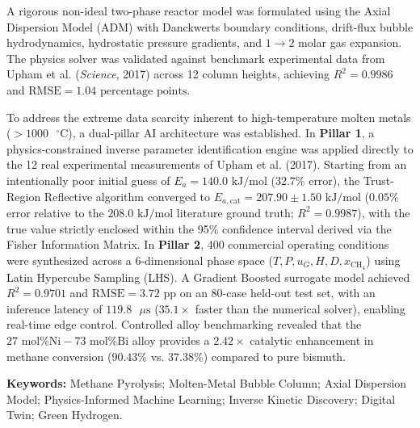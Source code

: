 \documentclass[12pt,a4paper,oneside]{report}
\begin{document}
A rigorous non-ideal two-phase reactor model was formulated using the Axial Dispersion Model (ADM) with Danckwerts boundary conditions, drift-flux bubble hydrodynamics, hydrostatic pressure gradients, and $1 \rightarrow 2$ molar gas expansion. The physics solver was validated against benchmark experimental data from Upham et al. (\textit{Science}, 2017) across 12 column heights, achieving $R^2 = 0.9986$ and $\text{RMSE} = 1.04\text{ percentage points}$.

To address the extreme data scarcity inherent to high-temperature molten metals ($>1000\text{ }^\circ\text{C}$), a dual-pillar AI architecture was established. In \textbf{Pillar 1}, a physics-constrained inverse parameter identification engine was applied directly to the 12 real experimental measurements of Upham et al. (2017). Starting from an intentionally poor initial guess of $E_a = 140.0\text{ kJ/mol}$ ($32.7\%$ error), the Trust-Region Reflective algorithm converged to $E_{a,\text{cat}} = 207.90 \pm 1.50\text{ kJ/mol}$ ($0.05\%$ error relative to the $208.0\text{ kJ/mol}$ literature ground truth; $R^2 = 0.9987$), with the true value strictly enclosed within the 95\% confidence interval derived via the Fisher Information Matrix. In \textbf{Pillar 2}, 400 commercial operating conditions were synthesized across a 6-dimensional phase space ($T, P, u_G, H, D, x_{\text{CH}_4}$) using Latin Hypercube Sampling (LHS). A Gradient Boosted surrogate model achieved $R^2 = 0.9701$ and $\text{RMSE} = 3.72\text{ pp}$ on an 80-case held-out test set, with an inference latency of $119.8\text{ }\mu\text{s}$ ($35.1\times$ faster than the numerical solver), enabling real-time edge control. Controlled alloy benchmarking revealed that the $27\text{ mol\% Ni}-73\text{ mol\% Bi}$ alloy provides a $2.42\times$ catalytic enhancement in methane conversion ($90.43\%$ vs. $37.38\%$) compared to pure bismuth.

\vspace{5mm}
\noindent \textbf{Keywords:} Methane Pyrolysis; Molten-Metal Bubble Column; Axial Dispersion Model; Physics-Informed Machine Learning; Inverse Kinetic Discovery; Digital Twin; Green Hydrogen.

\newpage

\tableofcontents
\newpage
\listoffigures
\newpage
\listoftables
\newpage

\setcounter{page}{1}
\end{document}

